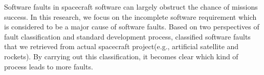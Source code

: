 Software faults in spacecraft software can largely obstruct the chance of missions success.
In this research, we focus on the incomplete software requirement which is considered to be a major cause of software faults.
Based on two perspectives of fault classification and standard development process, classified software faults that we retrieved from actual spacecraft project(e.g., artificial satellite and rockets).
By carrying out this classification, it becomes clear which kind of process leads to more faults.
